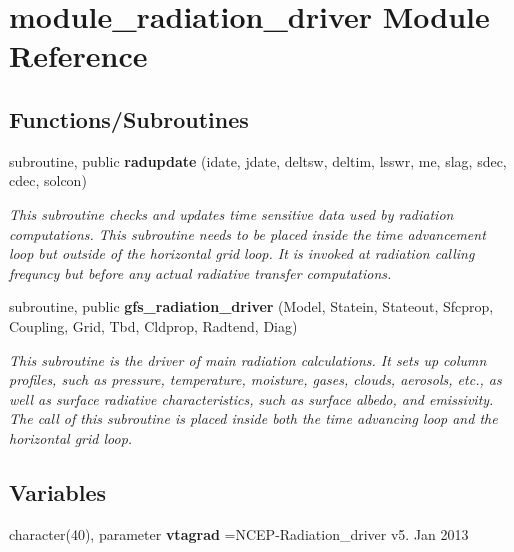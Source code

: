 \section{module\+\_\+radiation\+\_\+driver Module Reference}
\label{namespacemodule__radiation__driver}
\subsection*{Functions/\+Subroutines}
\textbf{ }\par
\begin{DoxyCompactItemize}
\item 
subroutine, public \textbf{ radupdate} (idate, jdate, deltsw, deltim, lsswr, me, slag, sdec, cdec, solcon)
\begin{DoxyCompactList}\small\item\em This subroutine checks and updates time sensitive data used by radiation computations. This subroutine needs to be placed inside the time advancement loop but outside of the horizontal grid loop. It is invoked at radiation calling frequncy but before any actual radiative transfer computations. \end{DoxyCompactList}\end{DoxyCompactItemize}

\textbf{ }\par
\begin{DoxyCompactItemize}
\item 
subroutine, public \textbf{ gfs\+\_\+radiation\+\_\+driver} (Model, Statein, Stateout, Sfcprop, Coupling, Grid, Tbd, Cldprop, Radtend, Diag)
\begin{DoxyCompactList}\small\item\em This subroutine is the driver of main radiation calculations. It sets up column profiles, such as pressure, temperature, moisture, gases, clouds, aerosols, etc., as well as surface radiative characteristics, such as surface albedo, and emissivity. The call of this subroutine is placed inside both the time advancing loop and the horizontal grid loop. \end{DoxyCompactList}\end{DoxyCompactItemize}

\subsection*{Variables}
\begin{DoxyCompactItemize}
\item 
character(40), parameter \textbf{ vtagrad} =\textquotesingle{}N\+C\+EP-\/Radiation\+\_\+driver v5. Jan 2013 \textquotesingle{}
\end{DoxyCompactItemize}
